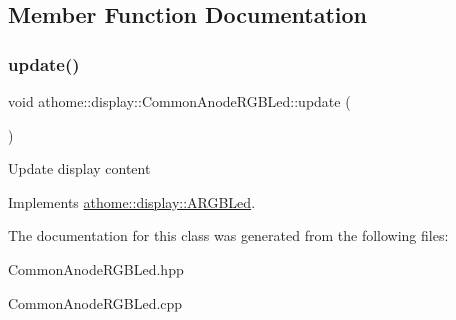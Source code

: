 \subsection{Member Function Documentation}
\mbox{\label{classathome_1_1display_1_1_common_anode_r_g_b_led_ab7daf7dcc6ac1e3fcab202cae484b237}} 
\subsubsection{\texorpdfstring{update()}{update()}}
{\footnotesize\ttfamily void athome\+::display\+::\+Common\+Anode\+R\+G\+B\+Led\+::update (\begin{DoxyParamCaption}{ }\end{DoxyParamCaption})\hspace{0.3cm}{\ttfamily [virtual]}}

Update display content 

Implements \mbox{\hyperlink{classathome_1_1display_1_1_a_r_g_b_led_a725ceca0c01735daa9c95148baf075ab}{athome\+::display\+::\+A\+R\+G\+B\+Led}}.



The documentation for this class was generated from the following files\+:\begin{DoxyCompactItemize}
\item 
Common\+Anode\+R\+G\+B\+Led.\+hpp\item 
Common\+Anode\+R\+G\+B\+Led.\+cpp\end{DoxyCompactItemize}

